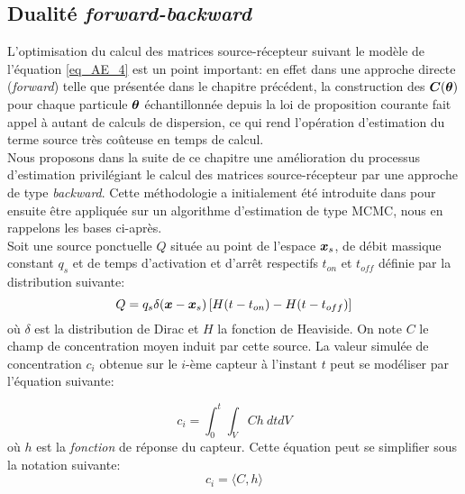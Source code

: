 \subsection{Dualité \textit{forward-backward}}

L'optimisation du calcul des matrices source-récepteur suivant le modèle de l'équation \eqref{eq_AE_4} est un point important: en effet dans une approche directe (\textit{forward}) telle que présentée dans le chapitre précédent, la construction des ${\bm{C}}({\bm{\theta}})$ pour chaque particule ${\bm{\theta}}$ échantillonnée depuis la loi de proposition courante fait appel à autant de calculs de dispersion, ce qui rend l'opération d'estimation du terme source très coûteuse en temps de calcul.\\

Nous proposons dans la suite de ce chapitre une amélioration du processus d'estimation privilégiant le calcul des matrices source-récepteur par une approche de type \textit{backward}. Cette méthodologie a initialement été introduite dans \cite{Keats2007} pour ensuite être appliquée sur un algorithme d'estimation de type MCMC, nous en rappelons les bases ci-après.\\

Soit une source ponctuelle $Q$ située au point de l'espace ${\bm{x}_s}$, de débit massique constant $q_s$ et de temps d'activation et d'arrêt respectifs $t_{on}$ et $t_{off}$ définie par la distribution suivante:\\

\begin{equation}
	Q = q_s \delta({\bm{x}} - {\bm{x}_s})\left[H(t - t_{on}) - H(t - t_{off})\right]
\end{equation}
où $\delta$ est la distribution de Dirac et $H$ la fonction de Heaviside. On note $C$ le champ de concentration moyen induit par cette  source. La valeur simulée de concentration $c_i$ obtenue sur le $i$-ème capteur à l'instant $t$ peut se modéliser par l'équation suivante:

\begin{equation}
c_i = \int_0^t \int_V C h ~dtdV
\label{eq_int_direct}
\end{equation}
où $h$ est la \textit{fonction} de réponse du capteur. Cette équation peut se simplifier sous la notation suivante:\\

\begin{equation}
c_i = \langle	C,h\rangle
\label{eq_scal_direct}
\end{equation} 

